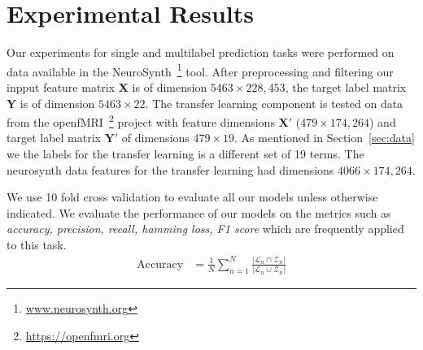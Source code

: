 \documentclass{article} %
\begin{document}
\section{Experimental Results} \label{sec:expt}

Our experiments for single and multilabel prediction tasks were performed on data available in the NeuroSynth~\footnote{\protect \url{www.neurosynth.org}} tool. After preprocessing and filtering our inpput feature matrix  $\mathbf{X}$ is of dimension $5463 \times 228,453$, the target label matrix $\mathbf{Y}$ is of dimension $5463 \times 22$. The transfer learning component is tested on data from the openfMRI~\footnote{\protect \url{https://openfmri.org}} project with feature dimensions $\mathbf{X}'$ ($479 \times 174,264$) and target label matrix $\mathbf{Y}'$ of dimensions $479 \times 19$. As mentioned in Section~\ref{sec:data} we the labels for the transfer learning is a different set of 19 terms. The neurosynth data features for the transfer learning had dimensions $4066 \times 174,264$.

We use 10 fold cross validation to evaluate all our models unless otherwise indicated. We evaluate the performance of our models on the metrics such as \textit{accuracy, precision, recall, hamming loss, F1 score} which are frequently applied to this task.
\begin{align*}
 \text{Accuracy} &= \frac{1}{N} \displaystyle\sum_{n=1}^{N} \frac{|\mathcal{L}_n \cap \mathcal{Z}_n|}{|\mathcal{L}_n \cup \mathcal{Z}_n|} 
\end{align*}
\end{document}
